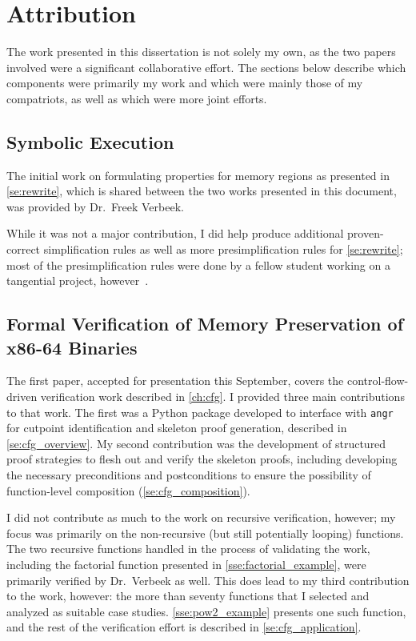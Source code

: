 \chapter{Attribution}\label{attribution}
The work presented in this dissertation is not solely my own,
as the two papers involved were a significant collaborative effort.
The sections below describe which components were primarily my work
and which were mainly those of my compatriots, as well as which were more joint efforts.

\section*{Symbolic Execution}
The initial work on formulating properties for memory regions
as presented in \cref{se:rewrite},
which is shared between the two works presented in this document,
was provided by Dr.~Freek Verbeek.

While it was not a major contribution,
I did help produce additional proven-correct simplification rules
as well as more presimplification rules for \cref{se:rewrite};
most of the presimplification rules
were done by a fellow student working on a tangential project,
however~\citep{verbeek2019refinement}.

\section*{Formal Verification of Memory Preservation of x86-64 Binaries}\label{attribute1}
The first paper, accepted for presentation this September,
covers the control-flow-driven verification work described in \cref{ch:cfg}.
I provided three main contributions to that work.
The first was a Python package developed to interface with \texttt{angr}
for cutpoint identification and skeleton proof generation,
described in \cref{se:cfg_overview}.
My second contribution was the development of structured proof strategies
to flesh out and verify the skeleton proofs,
including developing the necessary preconditions and postconditions to ensure
the possibility of function-level composition (\cref{se:cfg_composition}).

I did not contribute as much to the work on recursive verification, however;
my focus was primarily on the non-recursive (but still potentially looping) functions.
The two recursive functions handled in the process of validating the work,
including the factorial function presented in \cref{sse:factorial_example},
were primarily verified by Dr.~Verbeek as well.
This does lead to my third contribution to the work, however:
the more than seventy functions that I selected and analyzed as suitable case studies.
\cref{sse:pow2_example} presents one such function,
and the rest of the verification effort is described in \cref{se:cfg_application}.

